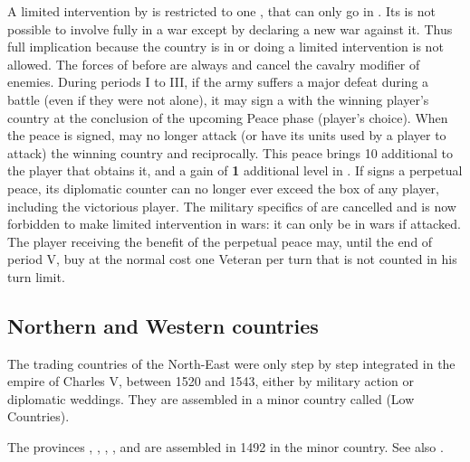 \bparag A limited intervention by  is restricted to one
\ARMY\faceplus, that can only go in .
\bparag Its is not possible to involve fully  in a war
except by declaring a new war against it. Thus full implication because
the country is in \EW or doing a limited intervention is not allowed.
The forces of  before \TBAR are always  and
cancel the cavalry modifier of enemies.
During periods I to III, if the  army suffers a major
defeat during a battle (even if they were not alone), it may sign a
 with the winning player's country at the
conclusion of the upcoming Peace phase (player's choice).
\bparag When the peace is signed,  may no longer attack (or
have its units used by a player to attack) the winning country and
reciprocally.
\bparag This peace brings 10 additional \VP to the player that obtains
it, and a gain of {\bf 1} additional level in \STAB.
\bparag If  signs a perpetual peace, its diplomatic counter
can no longer ever exceed the \MA box of any player, including the
victorious player. The military specifics of  are cancelled
and  is now forbidden to make limited intervention in wars:
it can only be in wars if attacked.
\bparag The player receiving the benefit of the perpetual peace may,
until the end of period V, buy at the normal cost one Veteran \LD per
turn that is not counted in his turn limit.


\subsection{Northern and Western countries}
\label{chSpecific:Belgium}
\begin{designnote}
  The trading countries of the North-East were only step by step
  integrated in the empire of Charles V, between 1520 and 1543, either
  by military action or diplomatic weddings. They are assembled in a
  minor country called  (Low Countries).
\end{designnote}
\aparag The provinces , ,
, , 
and \provinceZeeland
are assembled in 1492 in the  minor country. See also
.

